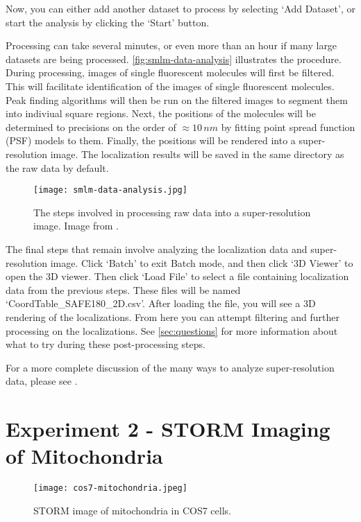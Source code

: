 \documentclass[10pt,a4paper,oneside]{book}
\begin{document}
Now, you can either add another dataset to process by selecting `Add Dataset', or start the analysis by clicking the `Start' button.

Processing can take several minutes, or even more than an hour if many large datasets are being processed. \autoref{fig:smlm-data-analysis} illustrates the procedure. During processing, images of single fluorescent molecules will first be filtered. This will facilitate identification of the images of single fluorescent molecules. Peak finding algorithms will then be run on the filtered images to segment them into indiviual square regions. Next, the positions of the molecules will be determined to precisions on the order of $\approx 10 \, nm$ by fitting point spread function (PSF) models to them. Finally, the positions will be rendered into a super-resolution image. The localization results will be saved in the same directory as the raw data by default.

\begin{figure}
    \centering
    \texttt{[image: smlm-data-analysis.jpg]}
    \caption{The steps involved in processing raw data into a super-resolution image. Image from \cite{martens-frontiersinbioinformatics-2022}.}
    \label{fig:smlm-data-analysis}
\end{figure}

The final steps that remain involve analyzing the localization data and super-resolution image. Click `Batch' to exit Batch mode, and then click `3D Viewer' to open the 3D viewer. Then click `Load File' to select a file containing localization data from the previous steps. These files will be named `CoordTable\_SAFE180\_2D.csv'. After loading the file, you will see a 3D rendering of the localizations. From here you can attempt filtering and further processing on the localizations. See \autoref{sec:questions} for more information about what to try during these post-processing steps.

For a more complete discussion of the many ways to analyze super-resolution data, please see \cite{martens-frontiersinbioinformatics-2022}.

\section{Experiment 2 - STORM Imaging of Mitochondria}

\begin{figure}[ht]
    \centering
    \texttt{[image: cos7-mitochondria.jpeg]}
    \caption{STORM image of mitochondria in COS7 cells.}
    \label{fig:cos7-mitochondria}
\end{figure}
\end{document}
